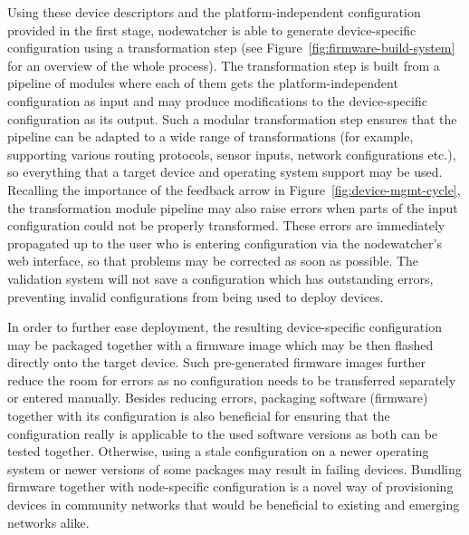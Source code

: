 \documentclass[5p,sort&compress]{elsarticle}
\begin{document}
Using these device descriptors and the platform-independent configuration provided in the first stage, nodewatcher is able to generate device-specific configuration using a transformation step (see Figure~\ref{fig:firmware-build-system} for an overview of the whole process).
The transformation step is built from a pipeline of modules where each of them gets the platform-independent configuration as input and may produce modifications to the device-specific configuration as its output.
Such a modular transformation step ensures that the pipeline can be adapted to a wide range of transformations (for example, supporting various routing protocols, sensor inputs, network configurations etc.), so everything that a target device and operating system support may be used.
Recalling the importance of the feedback arrow in Figure~\ref{fig:device-mgmt-cycle}, the transformation module pipeline may also raise errors when parts of the input configuration could not be properly transformed.
These errors are immediately propagated up to the user who is entering configuration via the nodewatcher's web interface, so that problems may be corrected as soon as possible.
The validation system will not save a configuration which has outstanding errors, preventing invalid configurations from being used to deploy devices.

In order to further ease deployment, the resulting device-specific configuration may be packaged together with a firmware image which may be then flashed directly onto the target device.
Such pre-generated firmware images further reduce the room for errors as no configuration needs to be transferred separately or entered manually.
Besides reducing errors, packaging software (firmware) together with its configuration is also beneficial for ensuring that the configuration really is applicable to the used software versions as both can be tested together.
Otherwise, using a stale configuration on a newer operating system or newer versions of some packages may result in failing devices.
Bundling firmware together with node-specific configuration is a novel way of provisioning devices in community networks  that would be beneficial to existing and emerging networks alike.
\end{document}
